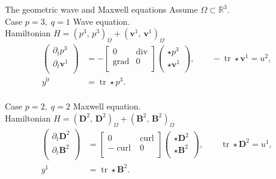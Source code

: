 \documentclass[aspectratio=169]{beamer}
\DeclareMathOperator*{\grad}{grad}
\renewcommand{\div}{\operatorname{div}}
\DeclareMathOperator*{\curl}{curl}
\DeclareMathOperator{\tr}{tr}
\newcommand{\bbR}{\mathbb{R}}
\newcommand{\inpr}[3][]{\ensuremath{( #2, \, #3 )_{#1}}}
\begin{document}
\begin{frame}{The geometric wave and Maxwell equations}
	Assume $\Omega \subset \bbR^3$. \\
	Case $p=3, \; q=1$ Wave equation. \\
	Hamiltonian $H= \inpr[\Omega]{p^3}{p^3}+ \inpr[\Omega]{\bm{v}^1}{\bm{v}^1}$
	\begin{equation*}
			\begin{aligned}
				\begin{pmatrix}
					\partial_t p^3 \\
					\partial_t \bm{v}^1\\
				\end{pmatrix} &= 
				-\begin{bmatrix}
					0 & \div \\
					\grad & 0 \\
				\end{bmatrix}
				\begin{pmatrix}
					\star p^3\\
					\star \bm{v}^1\\
				\end{pmatrix}, \qquad -\tr \star \bm{v}^1= u^{2}, \\
				y^{0} &= \tr \star p^3.
			\end{aligned}	
	\end{equation*}
	\vspace{.5cm}\\
	Case $p=2, \;q=2$ Maxwell equation.\\
	Hamiltonian $H= \inpr[\Omega]{\bm{D}^2}{\bm{D}^2}+ \inpr[\Omega]{\bm{B}^2}{\bm{B}^2}$
	\begin{equation*}
		\begin{aligned}
			\begin{pmatrix}
				\partial_t \bm{D}^2 \\
				\partial_t \bm{B}^2\\
			\end{pmatrix} &= 
			\begin{bmatrix}
				0 & \curl \\
				-\curl & 0 \\
			\end{bmatrix}
			\begin{pmatrix}
				\star \bm{D}^2 \\
				\star \bm{B}^2 \\
			\end{pmatrix}, \qquad \tr \star \bm{D}^2= u^{1}, \\
			y^{1} &= \tr \star \bm{B}^2. 
		\end{aligned}	
	\end{equation*}
	
\end{frame}
\end{document}
